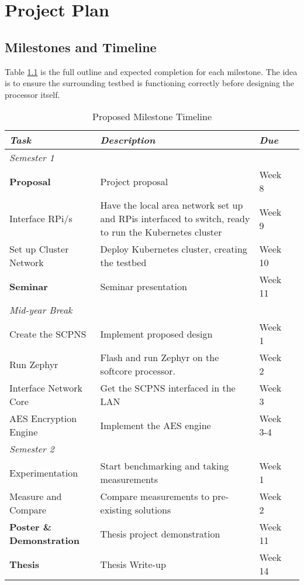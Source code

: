 \chapter[Project Outline]{Project Plan}
\label{Chap:Project Outline}

\section{Milestones and Timeline}
Table \ref{table:Milestones} is the full outline and expected completion for each milestone. The idea is to ensure the surrounding testbed is functioning correctly before designing the processor itself.
\begin{table}[hbt!]
    \centering
        \caption{Proposed Milestone Timeline}\label{table:Milestones}
        \begin{tabularx}{\textwidth}{ lXll }
            \hline
            \textit{Task} & \textit{Description} & \textit{Due} \\ 
            \hline
            \textit{Semester 1} \\
            \hline
            \textbf{Proposal} & Project proposal & Week 8 \\
            Interface RPi/s & Have the local area network set up and RPis interfaced to switch, ready to run the Kubernetes cluster & Week 9 \\
            Set up Cluster Network & Deploy Kubernetes cluster, creating the testbed & Week 10 \\
            \textbf{Seminar} & Seminar presentation & Week 11 \\
            \hline
            \textit{Mid-year Break} \\
            \hline
            Create the SCPNS & Implement proposed design & Week 1 \\
            Run Zephyr & Flash and run Zephyr on the softcore processor. & Week 2 \\
            Interface Network Core & Get the SCPNS interfaced in the LAN  & Week 3 \\ 
            AES Encryption Engine & Implement the AES engine & Week 3-4 \\ 
            \hline
            \textit{Semester 2} \\
            \hline
            Experimentation & Start benchmarking and taking measurements & Week 1 \\ 
            Measure and Compare &  Compare measurements to pre-existing solutions & Week 2 \\ 
            \textbf{Poster \& Demonstration} & Thesis project demonstration & Week 11 \\
            \textbf{Thesis} & Thesis Write-up & Week 14 \\
            \hline
            \end{tabularx}
    \end{table}

